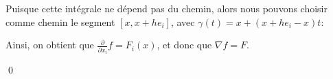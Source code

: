 \documentclass[a4paper]{article}
\begin{document}
{{        Puisque cette intégrale ne dépend pas du chemin, alors nous pouvons choisir comme chemin le segment $\left[x, x + he_i\right]$, avec $\gamma\left(t\right) = x + \left(x + he_i - x\right)t$: 

        Ainsi, on obtient que $\frac{\partial }{\partial x_i} f = F_i\left(x\right)$, et donc que $\nabla f = F$.
        
        \qed
    }
}
\end{document}
